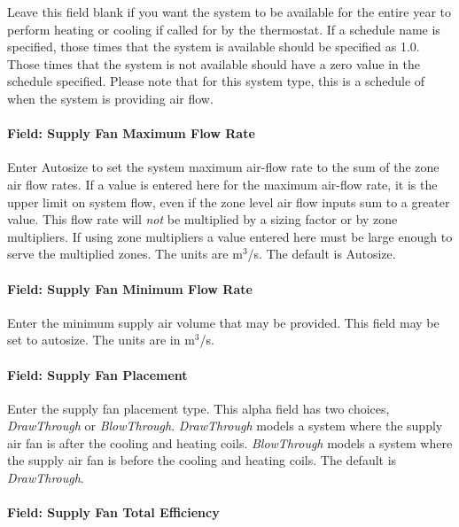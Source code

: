 Leave this field blank if you want the system to be available for the entire year to perform heating or cooling if called for by the thermostat. If a schedule name is specified, those times that the system is available should be specified as 1.0. Those times that the system is not available should have a zero value in the schedule specified. Please note that for this system type, this is a schedule of when the system is providing air flow.

\paragraph{Field: Supply Fan Maximum Flow Rate}\label{field-supply-fan-maximum-flow-rate-2}

Enter Autosize to set the system maximum air-flow rate to the sum of the zone air flow rates. If a value is entered here for the maximum air-flow rate, it is the upper limit on system flow, even if the zone level air flow inputs sum to a greater value. This flow rate will \emph{not} be multiplied by a sizing factor or by zone multipliers. If using zone multipliers a value entered here must be large enough to serve the multiplied zones. The units are m\(^{3}\)/s. The default is Autosize.

\paragraph{Field: Supply Fan Minimum Flow Rate}\label{field-supply-fan-minimum-flow-rate-1}

Enter the minimum supply air volume that may be provided. This field may be set to autosize. The units are in m\(^{3}\)/s.

\paragraph{Field: Supply Fan Placement}\label{field-supply-fan-placement-8}

Enter the supply fan placement type. This alpha field has two choices, \emph{DrawThrough} or \emph{BlowThrough}. \emph{DrawThrough} models a system where the supply air fan is after the cooling and heating coils. \emph{BlowThrough} models a system where the supply air fan is before the cooling and heating coils. The default is \emph{DrawThrough}.

\paragraph{Field: Supply Fan Total Efficiency}\label{field-supply-fan-total-efficiency-9}

